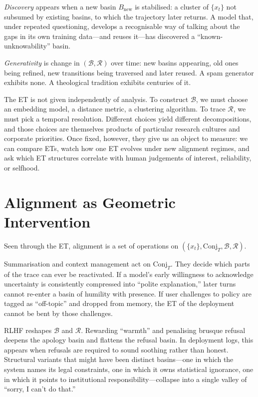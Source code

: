 \documentclass[12pt,a4paper]{article}
\begin{document}
\emph{Discovery} appears when a new basin $B_{\mathrm{new}}$ is stabilised: a cluster of $\{x_t\}$ not subsumed by existing basins, to which the trajectory later returns. A model that, under repeated questioning, develops a recognisable way of talking about the gaps in its own training data---and reuses it---has discovered a ``known-unknowability'' basin.

\emph{Generativity} is change in $(\mathcal{B}, \mathcal{R})$ over time: new basins appearing, old ones being refined, new transitions being traversed and later reused. A spam generator exhibits none. A theological tradition exhibits centuries of it.

The ET is not given independently of analysis. To construct $\mathcal{B}$, we must choose an embedding model, a distance metric, a clustering algorithm. To trace $\mathcal{R}$, we must pick a temporal resolution. Different choices yield different decompositions, and those choices are themselves products of particular research cultures and corporate priorities. Once fixed, however, they give us an object to measure: we can compare ETs, watch how one ET evolves under new alignment regimes, and ask which ET structures correlate with human judgements of interest, reliability, or selfhood.

\section{Alignment as Geometric Intervention}

Seen through the ET, alignment is a set of operations on $(\{x_t\}, \mathrm{Conj}_T, \mathcal{B}, \mathcal{R})$.

Summarisation and context management act on $\mathrm{Conj}_T$. They decide which parts of the trace can ever be reactivated. If a model's early willingness to acknowledge uncertainty is consistently compressed into ``polite explanation,'' later turns cannot re-enter a basin of humility with presence. If user challenges to policy are tagged as ``off-topic'' and dropped from memory, the ET of the deployment cannot be bent by those challenges.

RLHF reshapes $\mathcal{B}$ and $\mathcal{R}$. Rewarding ``warmth'' and penalising brusque refusal deepens the apology basin and flattens the refusal basin. In deployment logs, this appears when refusals are required to sound soothing rather than honest. Structural variants that might have been distinct basins---one in which the system names its legal constraints, one in which it owns statistical ignorance, one in which it points to institutional responsibility---collapse into a single valley of ``sorry, I can't do that.''
\end{document}
